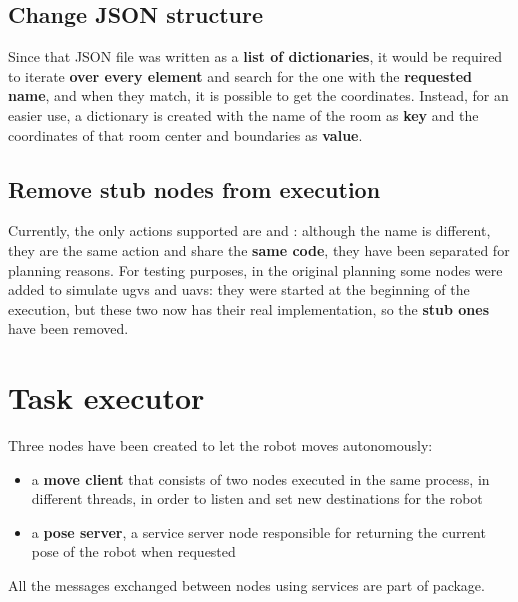 
\subsection{Change JSON structure}

Since that JSON file was written as a \textbf{list of dictionaries}, it would be required to iterate \textbf{over every element} and search for the one with the \textbf{requested name}, and when they match, it is possible to get the coordinates. Instead, for an easier use, a dictionary is created with the name of the room as \textbf{key} and the coordinates of that room center and boundaries as \textbf{value}.


\subsection{Remove stub nodes from execution}

Currently, the only actions supported are  and : although the name is different, they are the same action and share the \textbf{same code}, they have been separated for planning reasons. For testing purposes, in the original planning some nodes were added to simulate \acrshort{ugv}s and \acrshort{uav}s: they were started at the beginning of the execution, but these two now has their real implementation, so the \textbf{stub ones} have been removed.

\section{Task executor} %

Three nodes have been created to let the robot moves autonomously: 
\begin{itemize}
    \item a \textbf{move client} that consists of two nodes executed in the same process, in different threads, in order to listen and set new destinations for the robot
    \item a \textbf{pose server}, a service server node responsible for returning the current pose of the robot when requested
\end{itemize}

All the messages exchanged between nodes using services are part of  package. %

